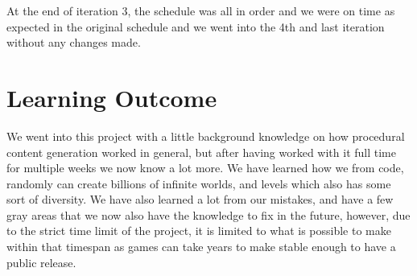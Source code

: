 At the end of iteration 3, the schedule was all in order and we were on time as expected in the original schedule and we went into the 4th and last iteration without any changes made.


\section{Learning Outcome}

We went into this project with a little background knowledge on how procedural content generation worked in general, but after having worked with it full time for multiple weeks we now know a lot more. We have learned how we from code, randomly can create billions of infinite worlds, and levels which also has some sort of diversity. We have also learned a lot from our mistakes, and have a few gray areas that we now also have the knowledge to fix in the future, however, due to the strict time limit of the project, it is limited to what is possible to make within that timespan as games can take years to make stable enough to have a public release.